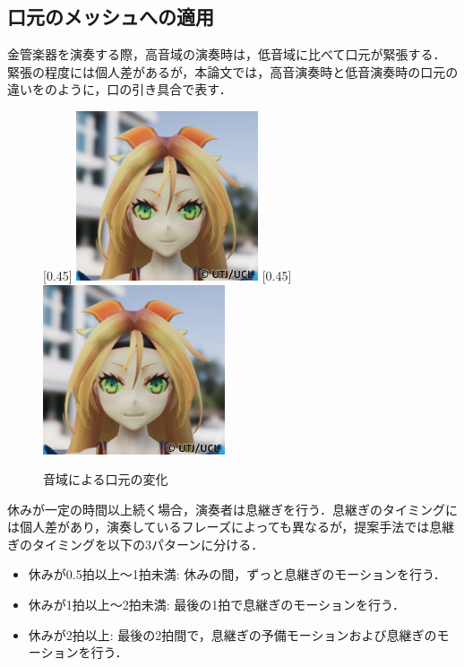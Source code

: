 \subsection{口元のメッシュへの適用}
\indent
金管楽器を演奏する際，高音域の演奏時は，低音域に比べて口元が緊張する．
緊張の程度には個人差があるが，本論文では，高音演奏時と低音演奏時の口元の違いをのように，口の引き具合で表す．\\
\begin{figure}[t]
	\centering
	[0.45\linewidth]{
		\includegraphics[height=5cm]{fig/chap3/low.eps}}
	[0.45\linewidth]{
		\includegraphics[height=5cm]{fig/chap3/high.eps}}
	\caption{音域による口元の変化}
	\label{fig:mouth}
\end{figure}
\indent
休みが一定の時間以上続く場合，演奏者は息継ぎを行う．息継ぎのタイミングには個人差があり，演奏しているフレーズによっても異なるが，提案手法では息継ぎのタイミングを以下の3パターンに分ける．\\
\begin{itemize}
	\item 休みが0.5拍以上～1拍未満: 休みの間，ずっと息継ぎのモーションを行う．
	\item 休みが1拍以上～2拍未満: 最後の1拍で息継ぎのモーションを行う．
	\item 休みが2拍以上: 最後の2拍間で，息継ぎの予備モーションおよび息継ぎのモーションを行う．
\end{itemize}


